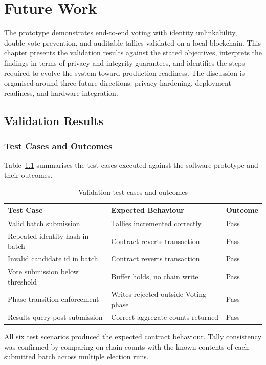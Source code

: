 \chapter{Future Work}
The prototype demonstrates end-to-end voting with identity unlinkability, double-vote prevention, and auditable tallies validated on a local blockchain. This chapter presents the validation results against the stated objectives, interprets the findings in terms of privacy and integrity guarantees, and identifies the steps required to evolve the system toward production readiness. The discussion is organised around three future directions: privacy hardening, deployment readiness, and hardware integration.
 
\section{Validation Results}
 
\subsection{Test Cases and Outcomes}
 
Table~\ref{tab:validation} summarises the test cases executed against the software prototype and their outcomes.
 
\begin{table}[htb]
\fontsize{10}{12}\selectfont
\caption{Validation test cases and outcomes}
\label{tab:validation}
\begin{tabular}{|p{5cm}|p{4cm}|p{3.5cm}|}
\hline
\textbf{Test Case} & \textbf{Expected Behaviour} & \textbf{Outcome} \\
\hline
Valid batch submission & Tallies incremented correctly & Pass \\\hline
Repeated identity hash in batch & Contract reverts transaction & Pass \\\hline
Invalid candidate \gls{id} in batch & Contract reverts transaction & Pass \\\hline
Vote submission below threshold & Buffer holds, no chain write & Pass \\\hline
Phase transition enforcement & Writes rejected outside Voting phase & Pass \\\hline
Results query post-submission & Correct aggregate counts returned & Pass \\
\hline
\end{tabular}
\end{table}
 
All six test scenarios produced the expected contract behaviour. Tally consistency was confirmed by comparing on-chain counts with the known contents of each submitted batch across multiple election runs.
 
